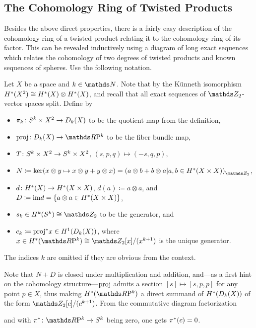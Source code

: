 \subsection{The Cohomology Ring of Twisted Products}
Besides the above direct properties, there is a fairly easy
description of the cohomology ring of a twisted product relating it to
the cohomology ring of its factor.
This can be revealed inductively using a diagram of long exact
sequences which relates the cohomology of two degrees of twisted
products and known sequences of spheres.
Use the following notation.

\begin{Def}
  Let $X$ be a space and $k\in\Nat$.
  Note that by the Künneth isomorphism
  $H^*(X^2)\cong H^*(X)\otimes H^*(X)$, and recall that all exact
  sequences of $\Zmod2$-vector spaces split.
  Define by
  \begin{itemize}
  \item
    $\pi_k\colon S^{k}\times X^2\to D_{k}({X})$
    to be the quotient map from the definition,
  \item
    $\proj\colon\Twistedprod k X\to \RP k$
    to be the fiber bundle map,
  \item
    $T\colon S^{k}\times X^2\to S^{k}\times X^2$,
    $(s,p,q)\mapsto(-s,q,p)$,
  \item
    $N\coloneqq
    \ker(x\otimes y\mapsto x\otimes y + y\otimes x)
    = \left(
        a\otimes b + b\otimes a
        \middle|
        a,b\in \H^*(X\times X)
      \right)_{\Zmod2}$,
  \item
    $d\colon H^*(X)\to H^*(X\times X)$,
    $d(a)\coloneqq a\otimes a$, and
    $D\coloneqq \mathrm{im} d
    = \left\{ a\otimes a \in H^*(X\times X) \right\}$,
  \item
    $s_k\in\H^k(\Sphere k)\cong\Zmod2$ to be the generator, and
  \item
    $c_k\coloneqq {\mathrm{proj}}^* x\in H^1(D_{k}({X}))$, where
    $x\in\H^*(\RP k)\cong\Zmod2[x]/(x^{k+1})$ is the unique generator.
  \end{itemize}
  The indices $k$ are omitted if they are obvious from the context.
\end{Def}
\begin{Rem}
  Note that $N+D$ is closed under multiplication and addition,
  and---as a first hint on the cohomology structure---$\mathrm{proj}$ admits a
  section  $[s]\mapsto[s,p,p]$ for any point $p\in X$, thus making
  $\H^*(\RP k)$ a direct summand of $H^*(D_{k}({X}))$ of the
  form $\Zmod2[c]/(c^{k+1})$.
  From the commutative diagram factorization
  \begin{center}
  \end{center}
  and with $\pb\pi\colon\RP k\to\Sphere k$ being zero, one gets ${\pi}^*(c)=0$.
\end{Rem}
